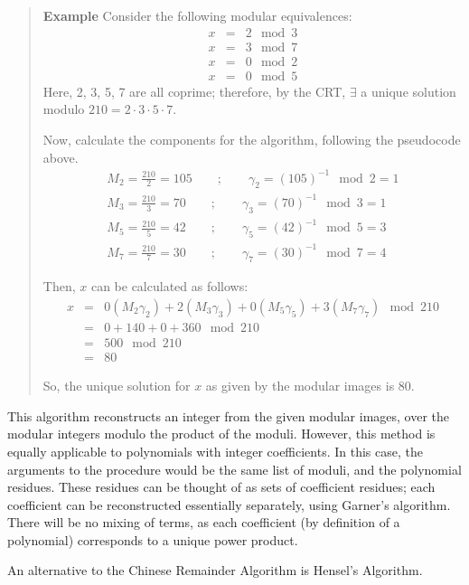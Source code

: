 \documentclass[letterpaper,12pt,titlepage,oneside,final]{book}
\newenvironment{example}{\begin{quote}%
  \textbf{Example }%
  \quad
}{%
\end{quote}%
}
\begin{document}
\begin{example}\label{CRA}
  Consider the following modular equivalences:
  \begin{eqnarray*}
    x &=& 2 \mod 3\\
    x &=& 3 \mod 7\\
    x &=& 0 \mod 2\\
    x &=& 0 \mod 5
  \end{eqnarray*}  
  Here, 2, 3, 5, 7 are all coprime; therefore, by the CRT, ${\exists}$ a unique solution modulo ${210 = 2 \cdot 3 \cdot 5 \cdot 7}$. 

  Now, calculate the components for the algorithm, following the pseudocode above.
  \begin{eqnarray*}
    M_2 = \frac{210}{2} = 105 \qquad ; \qquad \gamma_2 = (105)^{-1} \mod 2 = 1\\
    M_3 = \frac{210}{3} = 70 \qquad ; \qquad \gamma_3 = (70)^{-1} \mod 3 = 1\\
    M_5 = \frac{210}{5} = 42 \qquad ; \qquad \gamma_5 = (42)^{-1} \mod 5 = 3\\
    M_7 = \frac{210}{7} = 30 \qquad ; \qquad \gamma_7 = (30)^{-1} \mod 7 = 4
  \end{eqnarray*}

  Then, ${x}$ can be calculated as follows:
  \begin{eqnarray*}
    x &=& 0(M_2\gamma_2) + 2(M_3\gamma_3) + 0(M_5\gamma_5) + 3(M_7\gamma_7) \mod 210\\
      &=& 0 + 140 + 0 + 360 \mod 210\\
      &=& 500 \mod 210\\
      &=& 80
  \end{eqnarray*}

  So, the unique solution for ${x}$ as given by the modular images is 80.
\end{example}

This algorithm reconstructs an integer from the given modular images, over the modular integers modulo the product of the moduli.  However, this method is equally applicable to polynomials with integer coefficients.  In this case, the arguments to the procedure would be the same list of moduli, and the polynomial residues.  These residues can be thought of as sets of coefficient residues; each coefficient can be reconstructed essentially separately, using Garner's algorithm.  There will be no mixing of terms, as each coefficient (by definition of a polynomial) corresponds to a unique power product. 

An alternative to the Chinese Remainder Algorithm is Hensel's Algorithm.              
\end{document}
